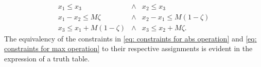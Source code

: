 \documentclass[twocolumn,letterpaper]{IEEEAerospaceCLS}  %
\theoremstyle{definition}
\begin{document}
\begin{equation}
  \begin{array}{ccc} \label{eq: constraints for max operation} 
    x_{1} \leq x_3 &\wedge& x_2\leq x_3  \\
    x_1-x_2 \leq M\zeta &\wedge& x_2-x_1 \leq M(1-\zeta) \\
    x_3 \leq x_1+ M(1-\zeta) &\wedge & x_3 \leq x_2 + M\zeta .
  \end{array}
\end{equation}
The equivalency of the constraints in \eqref{eq: constraints for abs operation} and \eqref{eq: constraints for max operation} to their respective assignments is evident in the expression of a truth table. 






\end{document}

